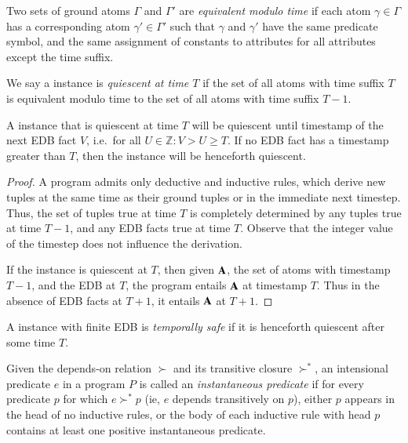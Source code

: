 \begin{definition}
Two sets of ground atoms $\Gamma$ and $\Gamma'$ are \emph{equivalent modulo
time} if each atom $\gamma \in \Gamma$ has a corresponding atom $\gamma' \in
\Gamma'$ such that $\gamma$ and $\gamma'$ have the same predicate symbol, and
the same assignment of constants to attributes for all attributes except the
time suffix.
\end{definition}


\begin{definition}
We say a \slang instance is \emph{quiescent at time $T$} if the set of all
atoms with time suffix $T$ is equivalent modulo time to the set of all atoms
with time suffix $T-1$.
\end{definition}


\begin{lemma}
A \slang instance that is quiescent at time $T$ will be quiescent until
timestamp of the next EDB fact $V$, i.e.\ for all $U \in \mathbb{Z}: V > U \ge
T$.  If no EDB fact has a timestamp greater than $T$, then the instance will be
henceforth quiescent.
\end{lemma}
\begin{proof}
A \slang program admits only deductive and inductive rules, which derive
new tuples at the same time as their ground tuples or in the immediate next
timestep.  Thus, the set of tuples true at time $T$ is completely determined by
any tuples true at time $T-1$, and any EDB facts true at time $T$.  Observe
that the integer value of the timestep does not influence the derivation.

If the instance is quiescent at $T$, then given ${\bf A}$, the set of atoms
with timestamp $T-1$, and the EDB at $T$, the program entails ${\bf
A}$ at timestamp $T$.  Thus in the absence of EDB facts at $T+1$, it entails
${\bf A}$ at $T+1$.
\end{proof}

\begin{definition}
A \slang instance with finite EDB is \emph{temporally safe} if it is henceforth
quiescent after some time $T$.
\end{definition}

\begin{definition}
Given the depends-on relation $\succ$ and its transitive closure $\succ^{*}$,
an intensional predicate $e$ in a program $P$ is called an \emph{instantaneous
predicate} if for every predicate $p$ for which $e \succ^{*} p$ (ie, $e$
depends transitively on $p$), either $p$ appears in the head of no inductive rules, or the body
of each inductive rule with head $p$  contains at least one positive instantaneous 
predicate.

\end{definition}

